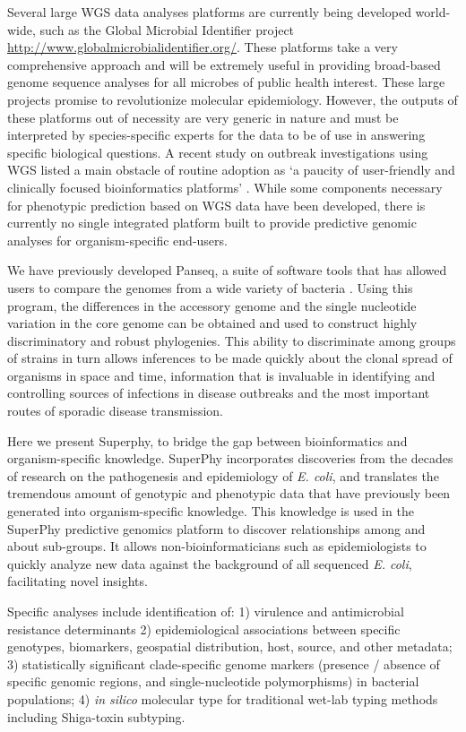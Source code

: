 \documentclass[doublespacing, linenumbers]{bmcart}
\begin{document}
Several large WGS data analyses platforms are currently being developed world-wide, such as the Global Microbial Identifier project \url{http://www.globalmicrobialidentifier.org/}. These platforms take a very comprehensive approach and will be extremely useful in providing broad-based genome sequence analyses for all microbes of public health interest. These large projects promise to revolutionize molecular epidemiology. However, the outputs of these platforms out of necessity are very generic in nature and must be interpreted by species-specific experts for the data to be of use in answering specific biological questions. A recent study on outbreak investigations using WGS listed a main obstacle of routine adoption as `a paucity of user-friendly and clinically focused bioinformatics platforms'  \cite{sherry_outbreak_2013}. While some components necessary for phenotypic prediction based on WGS data have been developed, there is currently no single integrated platform built to provide predictive genomic analyses for organism-specific end-users.

We have previously developed Panseq, a suite of software tools that has allowed users to compare the genomes from a wide variety of bacteria \cite{laing_pan-genome_2010}. Using this program, the differences in the accessory genome and the single nucleotide variation in the core genome can be obtained and used to construct highly discriminatory and robust phylogenies. This ability to discriminate among groups of strains in turn allows inferences to be made quickly about the clonal spread of organisms in space and time, information that is invaluable in identifying and controlling sources of infections in disease outbreaks and the most important routes of sporadic disease transmission. 

Here we present Superphy, to bridge the gap between bioinformatics and organism-specific knowledge. SuperPhy incorporates discoveries from the decades of research on the pathogenesis and epidemiology of \textit{E. coli}, and translates the tremendous amount of genotypic and phenotypic data that have previously been generated into organism-specific knowledge. This knowledge is used in the SuperPhy predictive genomics platform to discover relationships among and about sub-groups. It allows non-bioinformaticians such as epidemiologists to quickly analyze new data against the background of all sequenced \textit{E. coli}, facilitating novel insights.

Specific analyses include identification of: 1) virulence and antimicrobial resistance determinants 2) epidemiological associations between specific genotypes, biomarkers, geospatial distribution, host, source, and other metadata; 3) statistically significant clade-specific genome markers (presence / absence of specific genomic regions, and single-nucleotide polymorphisms) in bacterial populations; 4) \textit{in silico} molecular type for traditional wet-lab typing methods including Shiga-toxin subtyping.
\end{document}

